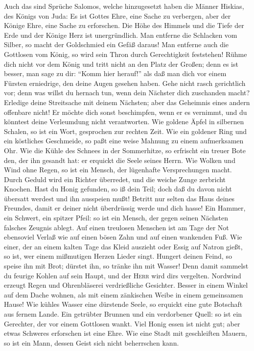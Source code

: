  Auch das sind Sprüche Salomos, welche hinzugesetzt haben
die Männer Hiskias, des Königs von Juda:  Es ist Gottes
Ehre, eine Sache zu verbergen, aber der Könige Ehre, eine Sache zu
erforschen.  Die Höhe des Himmels und die Tiefe der Erde
und der Könige Herz ist unergründlich.  Man entferne die
Schlacken vom Silber, so macht der Goldschmied ein Gefäß daraus!
 Man entferne auch die Gottlosen vom König, so wird sein
Thron durch Gerechtigkeit feststehen!  Rühme dich nicht
vor dem König und tritt nicht an den Platz der Großen; 
denn es ist besser, man sage zu dir: ``Komm hier herauf!'' als daß man
dich vor einem Fürsten erniedrige, den deine Augen gesehen haben.
 Gehe nicht rasch gerichtlich vor; denn was willst du
hernach tun, wenn dein Nächster dich zuschanden macht? 
Erledige deine Streitsache mit deinem Nächsten; aber das Geheimnis eines
andern offenbare nicht!  Er möchte dich sonst
beschimpfen, wenn er es vernimmt, und du könntest deine Verleumdung
nicht verantworten.  Wie goldene Äpfel in silbernen
Schalen, so ist ein Wort, gesprochen zur rechten Zeit. 
Wie ein goldener Ring und ein köstliches Geschmeide, so paßt eine weise
Mahnung zu einem aufmerksamen Ohr.  Wie die Kühle des
Schnees in der Sommerhitze, so erfrischt ein treuer Bote den, der ihn
gesandt hat: er erquickt die Seele seines Herrn.  Wie
Wolken und Wind ohne Regen, so ist ein Mensch, der lügenhafte
Versprechungen macht.  Durch Geduld wird ein Richter
überredet, und die weiche Zunge zerbricht Knochen.  Hast
du Honig gefunden, so iß dein Teil; doch daß du davon nicht übersatt
werdest und ihn ausspeien mußt!  Betritt nur selten das
Haus deines Freundes, damit er deiner nicht überdrüssig werde und dich
hasse!  Ein Hammer, ein Schwert, ein spitzer Pfeil: so
ist ein Mensch, der gegen seinen Nächsten falsches Zeugnis ablegt.
 Auf einen treulosen Menschen ist am Tage der Not
ebensoviel Verlaß wie auf einen bösen Zahn und auf einen wankenden Fuß.
 Wie einer, der an einem kalten Tage das Kleid auszieht
oder Essig auf Natron gießt, so ist, wer einem mißmutigen Herzen Lieder
singt.  Hungert deinen Feind, so speise ihn mit Brot;
dürstet ihn, so tränke ihn mit Wasser!  Denn damit
sammelst du feurige Kohlen auf sein Haupt, und der \textsc{Herr} wird
dir\textquotesingle s vergelten.  Nordwind erzeugt Regen
und Ohrenbläserei verdrießliche Gesichter.  Besser in
einem Winkel auf dem Dache wohnen, als mit einem zänkischen Weibe in
einem gemeinsamen Hause!  Wie kühles Wasser eine
dürstende Seele, so erquickt eine gute Botschaft aus fernem Lande.
 Ein getrübter Brunnen und ein verdorbener Quell: so ist
ein Gerechter, der vor einem Gottlosen wankt.  Viel Honig
essen ist nicht gut; aber etwas Schweres erforschen ist eine Ehre.
 Wie eine Stadt mit geschleiften Mauern, so ist ein Mann,
dessen Geist sich nicht beherrschen kann.

